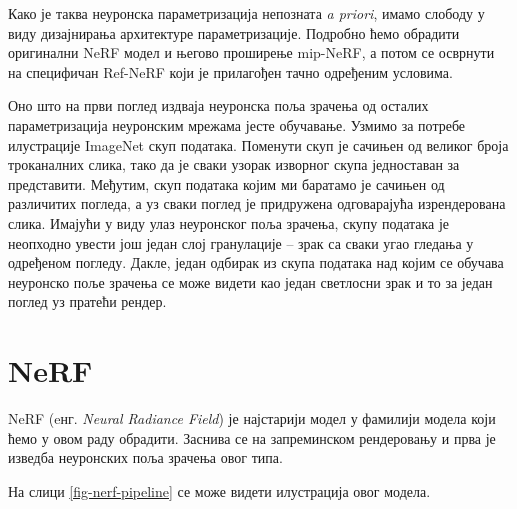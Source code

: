 \documentclass[12pt, a4paper, twoside]{book}
\numberwithin{equation}{chapter}
\numberwithin{theorem}{section}
\numberwithin{definition}{section}
\numberwithin{definitionChapter}{chapter}
\begin{document}
	Како је таква неуронска параметризација непозната \textit{a priori}, имамо слободу у виду дизајнирања архитектуре
	параметризације. Подробно ћемо обрадити оригинални NeRF модел и његово проширење mip-NeRF, а
	потом се осврнути на специфичан Ref-NeRF који је прилагођен тачно одређеним условима.
	
	Оно што на први поглед издваја неуронска поља зрачења од осталих параметризација неуронским мрежама јесте
	обучавање. Узмимо за потребе илустрације ImageNet \cite{imagenet} скуп података. Поменути скуп је сачињен
	од великог броја троканалних слика, тако да је сваки узорак изворног скупа једноставан за представити.
	Међутим, скуп података којим ми баратамо је сачињен од различитих погледа, а уз сваки поглед је придружена
	одговарајућа изрендерована слика. Имајући у виду улаз неуронског поља зрачења, скупу података је неопходно
	увести још један слој гранулације -- зрак са сваки угао гледања у одређеном погледу. Дакле, један одбирак
	из скупа података над којим се обучава неуронско поље зрачења се може видети као један светлосни зрак и то за
	један поглед уз пратећи рендер.

\section{NeRF}
NeRF (eнг. \textit{Neural Radiance Field}) је најстарији модел у фамилији модела који ћемо у овом раду обрадити.
Заснива се на запреминском рендеровању и прва је изведба неуронских поља зрачења овог типа.

На слици \ref{fig-nerf-pipeline} се може видети илустрација овог модела.
\end{document}
